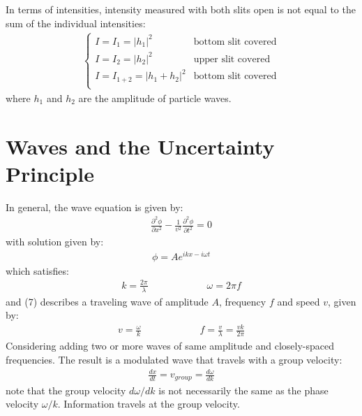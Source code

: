 \documentclass[11pt]{article}
\theoremstyle{break}
\theoremstyle{break}
\begin{document}
In terms of intensities, intensity measured with both slits open is not equal to the sum of the individual intensities:
\begin{align*}
\begin{cases}
I = I_1 = |h_1|^2 & \text{bottom slit covered}\\
I = I_2 = |h_2|^2 & \text{upper slit covered}\\
I = I_{1+2} = |h_1+h_2|^2 & \text{bottom slit covered}\\
\end{cases}
\end{align*}
where $h_1$ and $h_2$ are the amplitude of particle waves. \\

\newpage

\section{Waves and the Uncertainty Principle}
In general, the wave equation is given by:
\begin{align}
\frac{\partial^2 \phi}{\partial x^2} - \frac{1}{v^2}\frac{\partial^2 \phi}{\partial t^2} = 0
\end{align}
with solution given by:
\begin{align}
\phi = Ae^{ikx - i\omega t}
\end{align} 
which satisfies:
\begin{align*}
k = \frac{2\pi}{\lambda} \qquad\qquad\qquad \omega = 2\pi f
\end{align*}
and (7) describes a traveling wave of amplitude $A$, frequency $f$ and speed $v$, given by:
\begin{align*}
v = \frac{\omega}{k} \qquad\qquad\qquad f = \frac{v}{\lambda} = \frac{v k}{2\pi}
\end{align*}
Considering adding two or more waves of same amplitude and closely-spaced frequencies. The result is a modulated wave that travels with a group velocity:
\begin{align*}
\frac{dx}{dt} = v_{group} = \frac{d\omega}{dk}
\end{align*}
note that the group velocity $d\omega/dk$ is not necessarily the same as the phase velocity $\omega / k$. Information travels at the group velocity. \\
\end{document}
